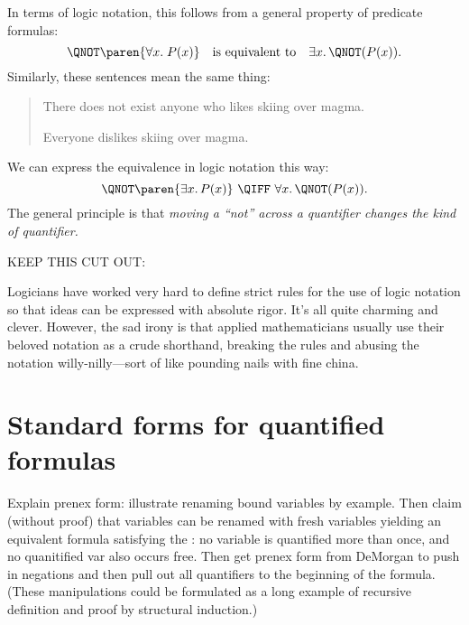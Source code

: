 \begin{editingnoes}
\begin{quote}
\end{quote}
%
In terms of logic notation, this follows from a general property of
predicate formulas:
%
\[
\QNOT \paren{\forall x.\; P(x)}
\quad \text{is equivalent to} \quad
\exists x.\, \QNOT(P(x)).
\]
%
Similarly, these sentences mean the same thing:
%
\begin{quote}
There does not exist anyone who likes skiing over magma.

Everyone dislikes skiing over magma.
\end{quote}
%
We can express the equivalence in logic notation this way:
%
\begin{equation}\label{nE}
\QNOT\paren{\exists x.\, P(x)}\  \QIFF\  \forall x.\, \QNOT(P(x)).
\end{equation}
%
The general principle is that \emph{moving a ``not'' across a
quantifier changes the kind of quantifier.}


\begin{editingnotes}
\begin{staffnotes}
KEEP THIS CUT OUT:
\end{staffnotes}

Logicians have worked very hard to define strict rules for the use of
logic notation so that ideas can be expressed with absolute rigor.
It's all quite charming and clever.  However, the sad irony is that
applied mathematicians usually use their beloved notation as a crude
shorthand, breaking the rules and abusing the notation
willy-nilly---sort of like pounding nails with fine china.
\end{editingnotes}

\begin{problems}

\classproblems
{}

\homeworkproblems
{}
\end{problems}



\section{Standard forms for quantified formulas}
\begin{editingnotes}
Explain prenex form: illustrate renaming bound variables by example.
Then claim (without proof) that variables can be renamed with fresh
variables yielding an equivalent formula satisfying the : no variable is quantified more than once, and no
quanitified var also occurs free.  Then get prenex form from DeMorgan
to push in negations and then pull out all quantifiers to the
beginning of the formula.  (These manipulations could be formulated as
a long example of recursive definition and proof by structural
induction.)
\end{editingnotes}


\end{editingnoes}
